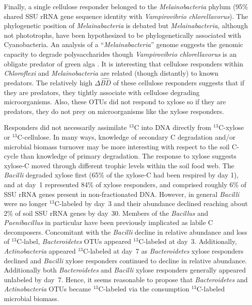 Finally, a single cellulose responder belonged to the \textit{Melainobacteria}
phylum (95\% shared SSU rRNA gene sequence identity with \textit{Vampirovibrio
chlorellavorus}). The phylogenetic position of \textit{Melainabacteria} is
debated but \textit{Melainabacteria}, although not phototrophs, have been
hypothesized to be phylogenetically associated with Cyanobacteria. An analysis
of a ``\textit{Melainabacteria}'' genome \citep{Di_Rienzi_2013} suggests the
genomic capacity to degrade polysaccharides though \textit{Vampirovibrio
chlorellavorus} is an obligate predator of green alga \citep{gromov_1972}. It
is interesting that cellulose responders within \textit{Chloroflexi} and
\textit{Melainobacteria} are related (though distantly) to known predators. The
relatively high $\Delta\hat{BD}$ of these cellulose responders suggests that if
they are predators, they tightly associate with cellulose degrading
microorganisms. Also, these OTUs did not respond to xylose so if they are
predators, they do not prey on microorganisms like the xylose responders.

Responders did not necessarily assimilate $^{13}$C into DNA directly
from $^{13}$C-xylose or $^{13}$C-cellulose. In many ways, knowledge of
secondary C degradation and/or microbial biomass turnover may be more
interesting with respect to the soil C-cycle than knowledge of primary
degradation. The response to xylose suggests xylose-C moved through different
trophic levels within the soil food web. The \textit{Bacilli} degraded xylose
first (65\% of the xylose-C had been respired by day 1), and at day~1
represented 84\% of xylose responders, and comprised roughly 6\% of SSU rRNA
genes present in non-fractionated DNA. However, in general
\textit{Bacilli} were no longer $^{13}$C-labeled by day~3 and their abundance
declined reaching about 2\% of soil SSU rRNA genes by day~30. Members of the
\textit{Bacillus} \citep{Cleveland2007} and \textit{Paenibacillus} in
particular \citep{Verastegui_2014} have been previously implicated as labile
C decomposers. Concomitant with the \textit{Bacilli} decline in relative
abundance and loss of $^{13}$C-label, \textit{Bacteroidetes} OTUs appeared
$^{13}$C-labeled at day~3. Additionally, \textit{Actinobacteria}
appeared $^{13}$C-labeled at day~7 as \textit{Bacteroidetes} xylose responders
declined and \textit{Bacilli} xylose responders continued to decline in
relative abundance. Additionally both \textit{Bacteroidetes} and
\textit{Bacilli} xylose responders generally appeared unlabeled by day~7.
Hence, it seems reasonable to propose that \textit{Bacteroidetes} and
\textit{Actinobacteria} OTUs became $^{13}$C-labeled via the consumption
$^{13}$C-labeled microbial biomass. 

